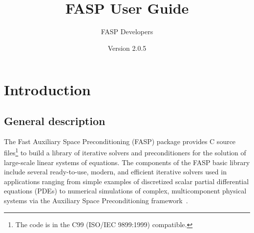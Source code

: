\documentclass[11pt]{memoir}
\title{\Huge FASP User Guide}
\author{FASP Developers}
\date{\vfill Version 2.0.5} %
\begin{document}
\clearpage\maketitle
\thispagestyle{empty}

\newpage
\setcounter{page}{1}
\tableofcontents

\chapter{Introduction}\label{ch:intro}




\section{General description}
The Fast Auxiliary Space Preconditioning (FASP) package provides
C source files\footnote{The code is in the C99 (ISO/IEC 9899:1999) compatible.} to build a library of
iterative solvers and preconditioners for the solution of large-scale
linear systems of equations.  The components of the FASP basic library
include several ready-to-use, modern, and efficient iterative solvers
used in applications ranging from simple examples of discretized
scalar partial differential equations (PDEs) to numerical simulations
of complex, multicomponent physical systems via the Auxiliary Space
Preconditioning framework~\cite{Xu.Xu.2010ff}.
\end{document}
